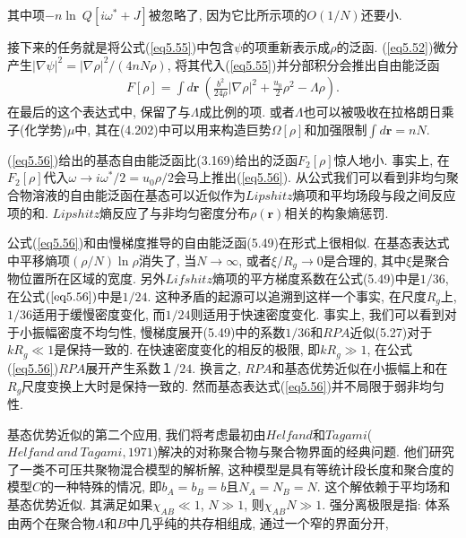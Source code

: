其中项$-n\ln\ Q[i\omega^{*}+J]$被忽略了, 因为它比所示项的$O(1/N)$还要小.
\par
接下来的任务就是将公式(\ref{eq5.55})中包含$\psi$的项重新表示成$\rho$的泛函.
(\ref{eq5.52})微分产生$|\nabla\psi|^{2}=|\nabla\rho|^{2}/(4nN\rho)$,
将其代入(\ref{eq5.55})并分部积分会推出自由能泛函
    \label{subsec.equations}
    \begin{equation}
        \begin{aligned}
            F[\rho]=\int d\bm{r}\
            \left(\frac{b^{2}}{24\rho}|\nabla\rho|^{2}+\frac{u_{0}}{2}\rho^{2}-\Lambda\rho
            \right).
                   \end{aligned}
        \label{eq5.56}
    \end{equation}
在最后的这个表达式中, 保留了与$\Lambda$成比例的项.
或者$\Lambda$也可以被吸收在拉格朗日乘子(化学势)$\mu$中,
其在(4.202)中可以用来构造巨势$\Omega[\rho]$和加强限制$\int d\bm{r}=nN$.
\par
(\ref{eq5.56})给出的基态自由能泛函比(3.169)给出的泛函$F_{2}[\rho]$惊人地小.
事实上, 在$F_{2}[\rho]$代入$\omega\longrightarrow
i\omega^{*}/2=u_{0}\rho/2$会马上推出(\ref{eq5.56}).
从公式我们可以看到非均匀聚合物溶液的自由能泛函在基态可以近似作为$Lipshitz$熵项和平均场段与段之间反应项的和.
$Lipshitz$熵反应了与非均匀密度分布$\rho(\bm{r})$相关的构象熵惩罚.
\par
公式(\ref{eq5.56})和由慢梯度推导的自由能泛函(5.49)在形式上很相似.
在基态表达式中平移熵项$(\rho/N)\ln\rho$消失了, 当$N\longrightarrow \infty$,
或者$\xi/R_{g}\longrightarrow 0$是合理的,
其中$\xi$是聚合物位置所在区域的宽度. 
另外$Lifshitz$熵项的平方梯度系数在公式(5.49)中是$1/36$,
在公式$(\ref{eq5.56})$中是$1/24$. 这种矛盾的起源可以追溯到这样一个事实,
在尺度$R_{g}$上, $1/36$适用于缓慢密度变化, 而$1/24$则适用于快速密度变化.
事实上, 我们可以看到对于小振幅密度不均匀性,
慢梯度展开(5.49)中的系数$1/36$和$RPA$近似(5.27)对于$kR_{g}\ll 1$是保持一致的.
在快速密度变化的相反的极限, 即$kR_{g}\gg 1$,
在公式(\ref{eq5.56})$RPA$展开产生系数$１/24$. 换言之,
$RPA$和基态优势近似在小振幅上和在$R_{g}$尺度变换上大时是保持一致的.
然而基态表达式(\ref{eq5.56})并不局限于弱非均匀性.
\par
基态优势近似的第二个应用, 我们将考虑最初由$Helfand$和$Tagami$($Helfand\ and\ Tagami, 1971$)解决的对称聚合物与聚合物界面的经典问题.
他们研究了一类不可压共聚物混合模型的解析解,
这种模型是具有等统计段长度和聚合度的模型$C$的一种特殊的情况,
即$b_{A}=b_{B}=b$且$N_{A}=N_{B}=N$. 这个解依赖于平均场和基态优势近似.
其满足如果$\chi_{AB}\ll 1$, $N\gg 1$, 则$\chi_{AB}N\gg 1$. 强分离极限是指:
体系由两个在聚合物$A$和$B$中几乎纯的共存相组成, 通过一个窄的界面分开,

